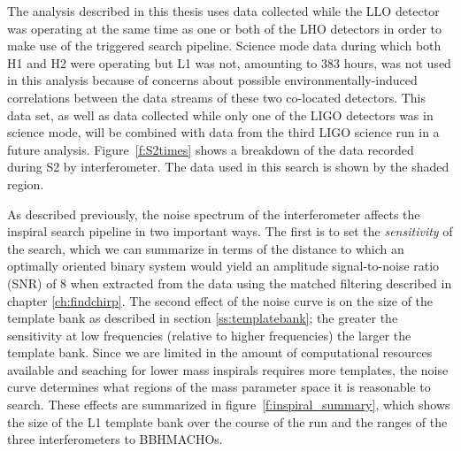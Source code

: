 The analysis described in this thesis uses data collected while the LLO
detector was operating at the same time as one or both of the LHO detectors in
order to make use of the triggered search pipeline.  Science mode data during
which both H1 and H2 were operating but L1 was not, amounting to 383 hours,
was not used in this analysis because of concerns about possible
environmentally-induced correlations between the data streams of these two
co-located detectors. This data set, as well as data collected while only one
of the LIGO detectors was in science mode, will be combined with data from the
third LIGO science run in a future analysis. Figure~\ref{f:S2times} shows a
breakdown of the data recorded during S2 by interferometer. The data used in
this search is shown by the shaded region.

As described previously, the noise spectrum of the interferometer affects the
inspiral search pipeline in two important ways. The first is to set the
\emph{sensitivity} of the search, which we can summarize  in terms of the
distance to which an optimally oriented binary system would yield an amplitude
signal-to-noise ratio (SNR) of 8 when extracted from the data using the
matched filtering described in chapter \ref{ch:findchirp}.  The second effect
of the noise curve is on the size of the template bank as described in section
\ref{ss:templatebank}; the greater the sensitivity at low frequencies
(relative to higher frequencies) the larger the template bank.  Since we are
limited in the amount of computational resources available and seaching for
lower mass inspirals requires more templates, the noise curve determines what
regions of the mass parameter space it is reasonable to search. These effects
are summarized in figure~\ref{f:inspiral_summary}, which shows the size of the
L1 template bank over the course of the run and the ranges of the three
interferometers to BBHMACHOs.

